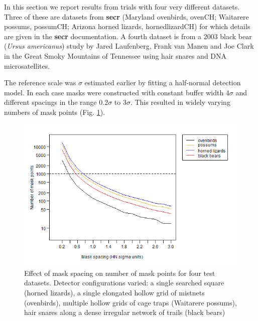\documentclass[
]{book}
\begin{document}
In this section we report results from trials with four very different datasets. Three of these are datasets from \textbf{secr} (Maryland ovenbirds, ovenCH; Waitarere possums, possumCH; Arizona horned lizards, hornedlizardCH) for which details are given in the \textbf{secr} documentation. A fourth dataset is from a 2003 black bear (\emph{Ursus americanus}) study by Jared Laufenberg, Frank van Manen and Joe Clark in the Great Smoky Mountains of Tennessee using hair snares and DNA microsatellites.

The reference scale was \(\sigma\) estimated earlier by fitting a half-normal detection model. In each case masks were constructed with constant buffer width \(4\sigma\) and different spacings in the range \(0.2\sigma\) to \(3\sigma\). This resulted in widely varying numbers of mask points (Fig. \ref{fig:maskpoints}).

\begin{figure}
\includegraphics[width=0.6\linewidth]{figures/maskrows} \caption{Effect of mask spacing on number of mask points for four test datasets. Detector configurations varied: a single searched square (horned lizards), a single elongated hollow grid of mistnets (ovenbirds), multiple hollow grids of cage traps (Waitarere possums), hair snares along a dense irregular network of trails (black bears)}\label{fig:maskpoints}
\end{figure}
\end{document}
